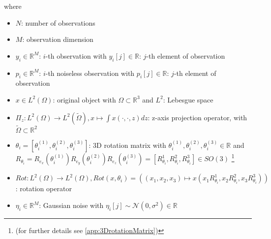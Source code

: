 where 
\begin{itemize}
    \item $N$: number of observations
    \item $M$: observation dimension
    \item $y_i \in \mathbb{R}^M$:  $i$-th observation with $y_i[j] \in \mathbb{R}$: $j$-th element of observation
    \item $p_i \in \mathbb{R}^M$:  $i$-th noiseless observation with $p_i[j] \in \mathbb{R}$: $j$-th element of observation
    \item $x \in L^2(\Omega)$: original object with $\Omega \subset \mathbb{R}^3 $ and $L^2$: Lebesgue space
    \item $\Pi_z : L^2(\Omega) \to L^2(\tilde{\Omega}), x \mapsto  \int x(\cdot,\cdot,z) dz$: z-axis projection operator,
          with $\tilde{\Omega} \subset \mathbb{R}^2$
    \item $\theta_i = [\theta_i^{(1)}, \theta_i^{(2)}, \theta_i^{(3)} ] $: 3D rotation matrix with $ \theta_i^{(1)}, \theta_i^{(2)}, \theta_i^{(3)} \in \mathbb{R}$ and \\
          $R_{\theta_i} =  R_{e_x} (\theta_i^{(1)}) R_{e_y} (\theta_i^{(2)}) R_{e_z} (\theta_i^{(3)}) = [R^1_{\theta_i}, R^2_{\theta_i}, R^3_{\theta_i}] \in SO(3)$ 
          \footnote{(for further details see \ref{app:3DrotationMatrix})}
          
    \item $\textit{Rot} : L^2(\Omega) \to L^2(\Omega), \textit{Rot}(x, \theta_i) = \left((x_1,x_2,x_3) \mapsto x( x_1R^1_{\theta_i}, x_2R^2_{\theta_i}, x_3R^3_{\theta_i})\right)$: rotation operator
    \item $\eta_i \in \mathbb{R}^M$: Gaussian noise with $\eta_i[j] \sim \mathcal{N}(0,\sigma^2) \in \mathbb{R}$
\end{itemize}




